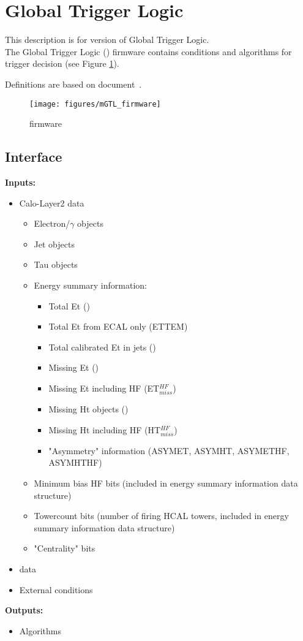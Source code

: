 \section{Global Trigger Logic}
\label{sec:gtl:global_trigger_logic}

This description is for version \versiongtl of Global Trigger Logic.\\

The Global Trigger Logic (\ugtl) firmware contains conditions and algorithms for trigger decision (see Figure \ref{fig:gtl:mGTL_firmware}).

Definitions are based on document~\cite{interface}.

\begin{figure}[htb]
\centering
\texttt{[image: figures/mGTL\_firmware]}
\caption{\ugtl firmware}
\label{fig:gtl:mGTL_firmware}
\end{figure}

\subsection{\ugtl Interface}
\label{sec:gtl:ugtl_interface}

\textbf{Inputs:}
\begin{itemize}
\item Calo-Layer2 data
\begin{itemize}
\item Electron/$\gamma$ objects
\item Jet objects
\item Tau objects
\item Energy summary information:
\begin{itemize}
\item Total Et (\ett)
\item Total Et from ECAL only (ETTEM)
\item Total calibrated Et in jets (\htt)
\item Missing Et (\etm)
\item Missing Et including HF (ET$_{miss}^{HF}$)
\item Missing Ht objects (\htm)
\item Missing Ht including HF (HT$_{miss}^{HF}$)
\item "Asymmetry" information (ASYMET, ASYMHT, ASYMETHF, ASYMHTHF)
\end{itemize}
\item Minimum bias HF bits (included in energy summary information data structure)
\item Towercount bits (number of firing HCAL towers, included in energy summary information data structure)
\item "Centrality" bits
\end{itemize}
\item \gmt data
\item External conditions
\end{itemize}
\textbf{Outputs:}
\begin{itemize}
\item Algorithms
\end{itemize}

